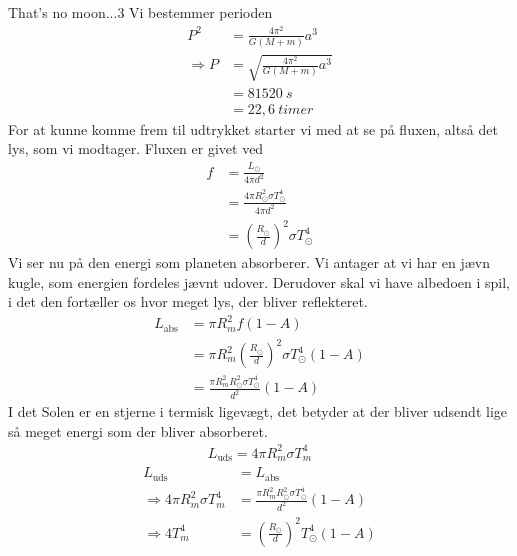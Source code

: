 
\begin{opgave}{That's no moon...}{3}
 \opg Vi bestemmer perioden 
 \begin{align*}
 P^2 &= \frac{4\pi ^2}{G\left( M+m\right)}a^3\\
 \Rightarrow P &= \sqrt{\frac{4\pi ^2}{G\left( M+m\right)}a^3}\\
 &= 81520~\si{s}\\
 &= 22,6~\si{timer}
 \end{align*}
 \opg For at kunne komme frem til udtrykket starter vi med at se på fluxen, altså det lys, som vi modtager. Fluxen er givet ved
 \begin{align*}
 f &= \frac{L_\odot}{4\pi d^2}\\
 &= \frac{4\pi R_\odot^2 \sigma T_\odot^4}{4\pi d^2}\\
 &= \left( \frac{R_\odot}{d}\right) ^2 \sigma T_\odot^4
 \end{align*}
 Vi ser nu på den energi som planeten absorberer. Vi antager at vi har en jævn kugle, som energien fordeles jævnt udover. Derudover skal vi have albedoen i spil, i det den fortæller os hvor meget lys, der bliver reflekteret. 
 \begin{align*}
 L_\text{abs} &= \pi R_{m}^2 f \left( 1-A\right) \\
 &= \pi R_{m}^2 \left( \frac{R_\odot}{d}\right) ^2 \sigma T_\odot^4 \left( 1-A\right)\\
 &= \frac{\pi R_m^2R_\odot^2 \sigma T_\odot^4}{d^2} \left( 1-A\right) 
 \end{align*}
 \opg I det Solen er en stjerne i termisk ligevægt, det betyder at der bliver udsendt lige så meget energi som der bliver absorberet. 
 \begin{align*}
 L_\text{uds} = 4\pi R_m^2 \sigma T_m^4
 \end{align*}
 \begin{align*}
 L_\text{uds} &= L_\text{abs} \\
 \Rightarrow 4\pi R_m^2 \sigma T_m^4 &= \frac{\pi R_m^2R_\odot^2 \sigma T_\odot^4}{d^2} \left( 1-A\right) \\
 \Rightarrow 4T_m^4 &= \left( \frac{R_\odot}{d} \right) ^2 T_\odot^4 \left( 1-A\right) \\

\end{align*}
\end{opgave}
